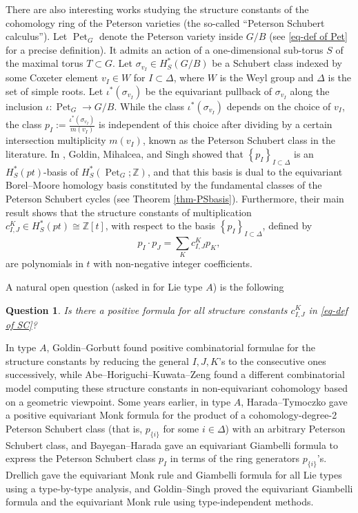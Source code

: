 \documentclass[11pt, letterpaper]{amsart}
\numberwithin{equation}{section}
\newtheorem{question}[theorem]{Question}
\DeclareMathOperator{\Pet}{Pet}
\begin{document}
There are also interesting works studying the structure constants of the cohomology ring of the Peterson varieties (the so-called ``Peterson Schubert calculus''). Let $\Pet_G$ denote the Peterson variety inside $G/B$ (see \eqref{eq-def of Pet} for a precise definition). It admits an action of a
one-dimensional sub-torus $S$ of the maximal torus $T\subset G$. Let $\sigma_{v_I} \in H_S^*(G / B)$ be a Schubert class indexed by some Coxeter element $v_I \in W$ for $I \subset \Delta$, where $W$ is the Weyl group and $\Delta$ is the set of simple roots. Let $\iota^*\left(\sigma_{v_I}\right)$ be the equivariant pullback of $\sigma_{v_I}$ along the inclusion $\iota: \Pet_G \rightarrow G / B$. While the class $\iota^*\left(\sigma_{v_I}\right)$ depends on the choice of $v_I$, the class $p_I:=\frac{\iota^*\left(\sigma_{v_I}\right)}{m\left(v_I\right)}$ is independent of this choice after dividing by a certain intersection multiplicity $m\left(v_I\right)$, known as the Peterson Schubert class in the literature. In \cite{Goldin2024positivity}, 
Goldin, Mihalcea, and Singh showed that $\left\{p_I\right\}_{I \subset \Delta}$ is an $H_S^*(p t)$-basis of $H_S^*(\Pet_G; \mathbb{Z})$, and that this basis is dual to the equivariant Borel--Moore homology basis constituted by the fundamental classes of the Peterson Schubert cycles (see Theorem \ref{thm-PSbasis}). 
Furthermore, their main result shows that the structure constants of multiplication $c_{I, J}^K\in H_S^*(p t)\cong\mathbb{Z}[t]$, with respect to the basis $\left\{p_I\right\}_{I \subset \Delta}$, defined by
\begin{equation} \label{eq-def of SC}
p_I \cdot p_J=\sum_K c_{I, J}^K p_K,
\end{equation}
are polynomials in $t$ with non-negative integer coefficients.

A natural open question (asked in \cite[P.43]{Harada2011positive} for Lie type $A$) is the following
\begin{question} \label{ques-intro}
    Is there a positive formula for all structure constants $c_{I, J}^K$ in \eqref{eq-def of SC}?
\end{question}
 In type $A$, Goldin--Gorbutt \cite{goldin2022positive} found positive combinatorial formulae for the structure constants by reducing the general $I,J,K$'s to the consecutive ones successively, while Abe--Horiguchi--Kuwata--Zeng \cite{abe2024geometry} found a different combinatorial model computing these structure constants in non-equivariant cohomology based on a geometric viewpoint. Some years earlier, in type $A$, Harada--Tymoczko \cite{Harada2011positive} gave a positive equivariant Monk formula for the product of a cohomology-degree-2 Peterson Schubert class (that is, $p_{\{i\}}$ for some $i\in \Delta$) with an arbitrary Peterson Schubert class, and Bayegan--Harada \cite{bayegan2013giambelli} gave an equivariant Giambelli formula to express the Peterson Schubert class $p_I$ in terms of the ring generators $p_{\{i\}}$'s. Drellich \cite{drellich2015monk} gave the equivariant Monk rule and Giambelli formula for all Lie types using a type-by-type analysis, and Goldin--Singh \cite{goldin2021equivariant} proved the equivariant Giambelli formula and the equivariant Monk rule using type-independent methods. 
\end{document}
